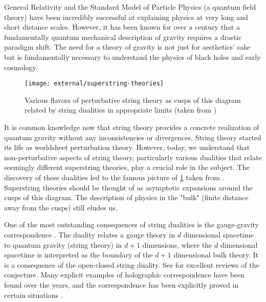 General Relativity and the Standard Model of Particle Physics (a quantum field theory) have been incredibly successful at explaining physics at very long and short distance scales. However, it has been known for over a century that a fundamentally quantum mechanical description of gravity requires a drastic paradigm shift. The need for a theory of gravity is not just for aesthetics' sake but is fundamentally necessary to understand the physics of black holes and early cosmology.

\begin{figure}[H]
  \centering
  \texttt{[image: external/superstring-theories]}
  \caption{Various flavors of perturbative string theory as cusps of this diagram related by string dualities in appropriate limits (taken from \cite{Polchinski:1999br})}
  \label{fig:superstring-theories}
\end{figure}

It is common knowledge now that string theory provides a concrete realization of quantum gravity without any inconsistencies or divergences. String theory started its life as worldsheet perturbation theory. However, today, we understand that non-perturbative aspects of string theory, particularly various dualities that relate seemingly different superstring theories, play a crucial role in the subject. The discovery of these dualities led to the famous picture of \cref{fig:superstring-theories} taken from \cite{Polchinski:1999br}. Superstring theories should be thought of as asymptotic expansions around the cusps of this diagram. The description of physics in the "bulk" (finite distance away from the cusps) still eludes us.

One of the most outstanding consequences of string dualities is the gauge-gravity correspondence \cite{Susskind:1994vu,Maldacena:1997re}. The duality relates a gauge theory in $d$ dimensional spacetime to quantum gravity (string theory) in $d+1$ dimensions, where the $d$ dimensional spacetime is interpreted as the boundary of the $d+1$ dimensional bulk theory. It is a consequence of the open-closed string duality. See \cite{Aharony:1999ti, Witten:1998qj} for excellent reviews of the conjecture. Many explicit examples of holographic correspondence have been found over the years, and the correspondence has been explicitly proved in certain situations \cite{Eberhardt:2019ywk,Gaberdiel:2021qbb}. 

